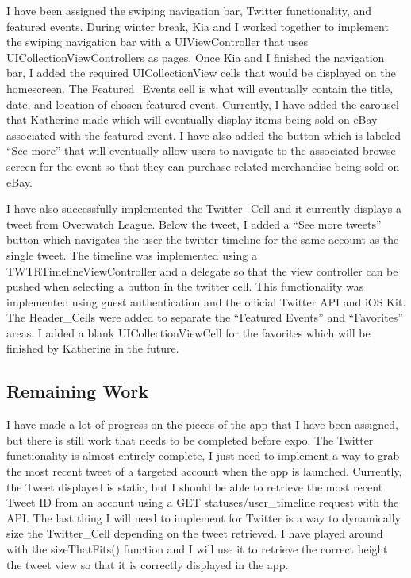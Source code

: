 \documentclass[onecolumn, draftclsnofoot,10pt, compsoc]{IEEEtran}
\begin{document}
I have been assigned the swiping navigation bar, Twitter functionality, and featured events. During winter break, Kia and I worked together to implement the swiping navigation bar with a UIViewController that uses UICollectionViewControllers as pages. Once Kia and I finished the navigation bar, I added the required UICollectionView cells that would be displayed on the homescreen. The Featured\_Events cell is what will eventually contain the title, date, and location of chosen featured event. Currently, I have added the carousel that Katherine made which will eventually display items being sold on eBay associated with the featured event. I have also added the button which is labeled “See more” that will eventually allow users to navigate to the associated browse screen for the event so that they can purchase related merchandise being sold on eBay.

I have also successfully implemented the Twitter\_Cell and it currently displays a tweet from Overwatch League. Below the tweet, I added a “See more tweets” button which navigates the user the twitter timeline for the same account as the single tweet. The timeline was implemented using a TWTRTimelineViewController and a delegate so that the view controller can be pushed when selecting a button in the twitter cell. This functionality was implemented using guest authentication and the official Twitter API and iOS Kit. The Header\_Cells were added to separate the “Featured Events” and “Favorites” areas. I added a blank UICollectionViewCell for the favorites which will be finished by Katherine in the future. 

\subsection{Remaining Work}
I have made a lot of progress on the pieces of the app that I have been assigned, but there is still work that needs to be completed before expo. The Twitter functionality is almost entirely complete, I just need to implement a way to grab the most recent tweet of a targeted account when the app is launched. Currently, the Tweet displayed is static, but I should be able to retrieve the most recent Tweet ID from an account using a GET statuses/user\_timeline request with the API. The last thing I will need to implement for Twitter is a way to dynamically size the Twitter\_Cell depending on the tweet retrieved. I have played around with the sizeThatFits() function and I will use it to retrieve the correct height the tweet view so that it is correctly displayed in the app.
\end{document}
